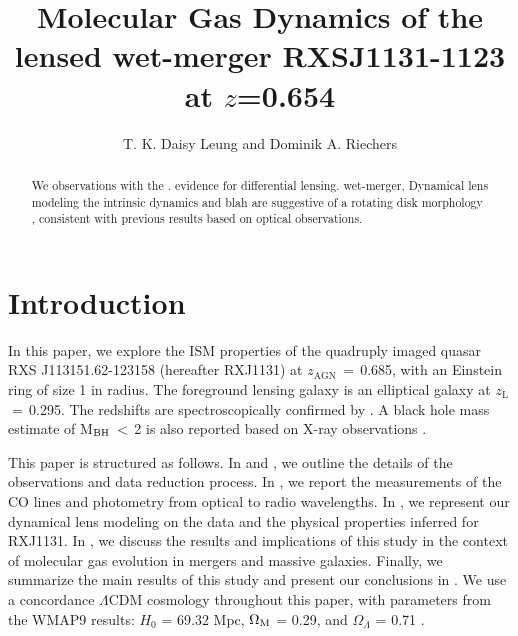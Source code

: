 \documentclass[]{emulateapj}
\begin{document}

\title{Molecular Gas Dynamics of the lensed wet-merger RXSJ1131-1123 at $z$=0.654}
\author{T. K. Daisy Leung and Dominik A. Riechers}


\begin{abstract}
We \bco observations with the \pdbi.
evidence for differential lensing.
wet-merger, Dynamical lens modeling
the intrinsic dynamics and blah are suggestive of a rotating disk morphology , consistent with previous results based on optical observations.
\end{abstract}


\section{Introduction}

In this paper, we explore the ISM properties of the quadruply imaged
quasar RXS J113151.62-123158 (hereafter RXJ1131) at
$z_\textrm{AGN}$\,$=$\,0.685, with an Einstein ring of size
1 in radius. The foreground lensing
galaxy is an elliptical galaxy at $z_\textrm{L}$\,$=$\,0.295. The redshifts
are spectroscopically confirmed by \citet{Sluse03a}.
A black hole mass estimate of M$_{\rm BH}$\,$<$\,2\Msun
is also reported based on X-ray observations \citep{Reis14a}.

This paper is structured as follows.
In  and , we outline the details of the observations and data reduction process.
In , we report the measurements of the CO lines and photometry from optical to radio wavelengths.
In , we represent our dynamical lens modeling on the \bco data and the physical properties inferred for  RXJ1131.
In , we discuss the results and implications of this study in the context of molecular gas evolution in mergers and massive galaxies.
Finally, we summarize the main results of this study and present our conclusions in .
We use a concordance $\Lambda$CDM cosmology throughout this paper, with
parameters from the WMAP9 results:
$H_0$ = 69.32 \kms Mpc\pmOne, $\Omega_{\rm M}$ = 0.29, and
$\Omega_{\Lambda}$ = 0.71 \citep{Hinshaw13a}.
\end{document}
